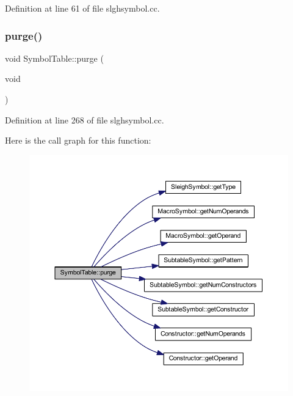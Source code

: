 Definition at line 61 of file slghsymbol.\+cc.

\mbox{\label{class_symbol_table_ac10fcbcf54614b127d5817f8c43a2cc3}} 
\subsubsection{\texorpdfstring{purge()}{purge()}}
{\footnotesize\ttfamily void Symbol\+Table\+::purge (\begin{DoxyParamCaption}\item[{void}]{ }\end{DoxyParamCaption})}



Definition at line 268 of file slghsymbol.\+cc.

Here is the call graph for this function\+:
\nopagebreak
\begin{figure}[H]
\begin{center}
\leavevmode
\includegraphics[width=350pt]{class_symbol_table_ac10fcbcf54614b127d5817f8c43a2cc3_cgraph}
\end{center}
\end{figure}
\mbox{\label{class_symbol_table_abb39dd66d5ca2d581be14628c7e596da}} 
